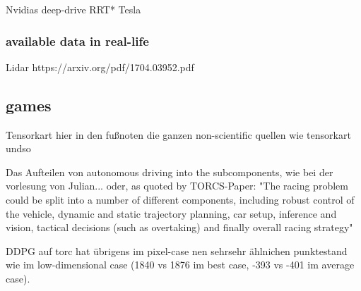 Nvidias deep-drive
RRT*
Tesla

\subsubsection{available data in real-life}

Lidar
https://arxiv.org/pdf/1704.03952.pdf


\subsection{games}

Tensorkart
hier in den fußnoten die ganzen non-scientific quellen wie tensorkart undso

Das Aufteilen von autonomous driving into the subcomponents, wie bei der vorlesung von Julian... oder, as quoted by TORCS-Paper: "The racing problem could be split into a number of different components, including robust control of the vehicle, dynamic and static trajectory planning, car setup, inference and vision, tactical decisions (such as overtaking) and finally overall racing strategy"

DDPG auf torc hat übrigens im pixel-case nen sehrsehr ählnichen punktestand wie im low-dimensional case (1840 vs 1876 im best case, -393 vs -401 im average case).